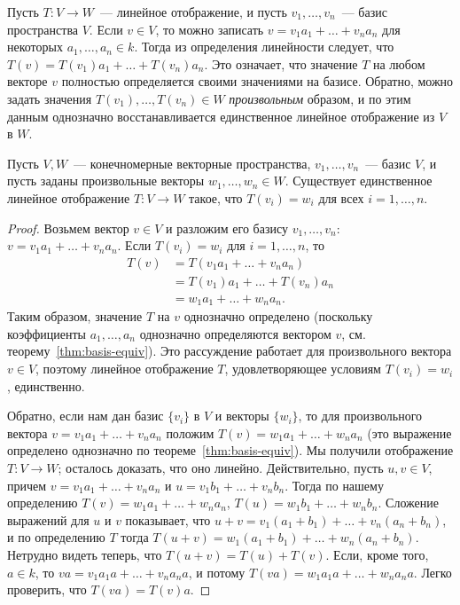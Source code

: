 Пусть $T\colon V\to W$~--- линейное отображение, и пусть
$v_1,\dots,v_n$~--- базис пространства $V$.
Если $v\in V$, то можно записать $v = v_1a_1 + \dots + v_na_n$
для некоторых $a_1,\dots,a_n\in k$. Тогда
из определения линейности следует, что
$T(v) = T(v_1)a_1 + \dots + T(v_n)a_n$.
Это означает, что значение $T$ на любом векторе $v$ полностью
определяется своими значениями на базисе. Обратно, можно задать
значения $T(v_1),\dots, T(v_n)\in W$ {\em произвольным} образом,
и по этим данным однозначно восстанавливается единственное
линейное отображение из $V$ в $W$.
\begin{theorem}\label{thm:universal-basis-property}
Пусть $V,W$~--- конечномерные векторные пространства,
$v_1,\dots,v_n$~--- базис $V$, и пусть заданы произвольные
векторы $w_1,\dots,w_n\in W$.
Существует единственное линейное отображение $T\colon V\to W$
такое, что $T(v_i) = w_i$ для всех $i=1,\dots,n$.
\end{theorem}
\begin{proof}
Возьмем вектор $v\in V$ и разложим его базису $v_1,\dots,v_n$:
$v = v_1a_1 + \dots + v_na_n$.
Если $T(v_i) = w_i$ для $i=1,\dots,n$, то
\begin{align*}
T(v) &= T(v_1a_1+\dots+v_na_n) \\
&= T(v_1)a_1+\dots+T(v_n)a_n \\
&= w_1a_1 + \dots + w_na_n.
\end{align*}
Таким образом, значение $T$ на $v$ однозначно определено
(поскольку коэффициенты $a_1,\dots,a_n$ однозначно определяются
вектором $v$, см. теорему~\ref{thm:basis-equiv}).
Это рассуждение работает для произвольного вектора $v\in V$,
поэтому линейное отображение $T$, удовлетворяющее условиям
$T(v_i) = w_i$, единственно.

Обратно, если нам дан базис $\{v_i\}$ в $V$ и
векторы $\{w_i\}$, то для произвольного вектора
$v = v_1a_1 + \dots + v_na_n$ положим
$T(v) = w_1a_1 + \dots + w_na_n$ (это выражение определено
однозначно по теореме~\ref{thm:basis-equiv}).
Мы получили отображение $T\colon V\to W$; осталось доказать, что
оно линейно. Действительно, пусть $u,v\in V$,
причем $v = v_1a_1+\dots+v_na_n$ и $u=v_1b_1+\dots+v_nb_n$.
Тогда по нашему определению
$T(v) = w_1a_1 + \dots + w_na_n$,
$T(u) = w_1b_1 + \dots + w_nb_n$.
Сложение выражений для $u$ и $v$ показывает, что
$u+v = v_1(a_1+b_1) + \dots + v_n(a_n+b_n)$, и по определению
$T$ тогда $T(u+v) = w_1(a_1+b_1) + \dots + w_n(a_n+b_n)$.
Нетрудно видеть теперь, что $T(u+v) = T(u) + T(v)$.
Если, кроме того, $a\in k$,
то $va = v_1a_1a + \dots + v_na_na$, и потому
$T(va) = w_1a_1a + \dots + w_na_na$. Легко проверить,
что $T(va) = T(v)a$.
\end{proof}

